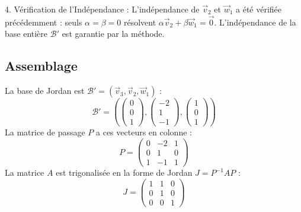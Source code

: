 \documentclass[french]{yLectureNote}
\renewcommand{\vec}{\overrightarrow}
\renewcommand{\vec}{\overrightarrow}
\begin{document}
4.  Vérification de l'Indépendance :
    L'indépendance de $\vec{v}_2$ et $\vec{w}_1$ a été vérifiée précédemment : seuls $\alpha=\beta=0$ résolvent $\alpha \vec{v}_2 + \beta \vec{w}_1 = \vec{0}$. L'indépendance de la base entière $\mathcal{B}'$ est garantie par la méthode.
\subsection{Assemblage}

La base de Jordan est $\mathcal{B}' = (\vec{v}_3, \vec{v}_2, \vec{w}_1)$ :
$$
\mathcal{B}' = \left( \begin{pmatrix} 0 \\ 0 \\ 1 \end{pmatrix}, \begin{pmatrix} -2 \\ 1 \\ -1 \end{pmatrix}, \begin{pmatrix} 1 \\ 0 \\ 1 \end{pmatrix} \right)
$$
La matrice de passage $P$ a ces vecteurs en colonne :
$$
P = \begin{pmatrix} 0 & -2 & 1 \\ 0 & 1 & 0 \\ 1 & -1 & 1 \end{pmatrix}
$$
La matrice $A$ est trigonalisée en la forme de Jordan $J = P^{-1} A P$ :
$$
J = \begin{pmatrix} 1 & 1 & 0 \\ 0 & 1 & 0 \\ 0 & 0 & 1 \end{pmatrix}
$$
\end{document}
